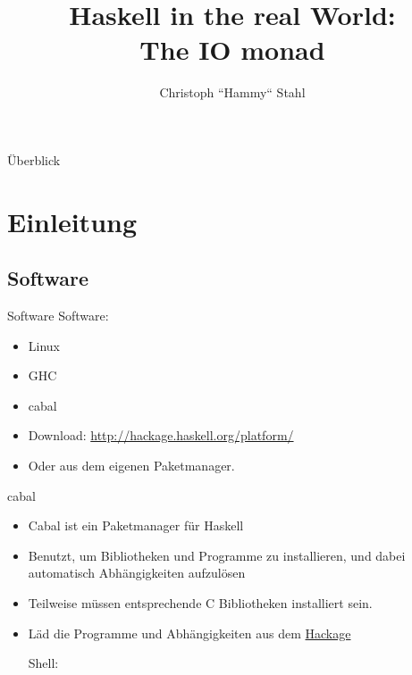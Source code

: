 \documentclass{beamer}
\title{Haskell in the real World: \\ The IO monad}
\author{Christoph ``Hammy`` Stahl}
\begin{document}
\begin{frame}
	\maketitle
\end{frame}
\begin{frame}{Überblick}
\begin{multicols}{2}
\begin{tiny}
\tableofcontents
\end{tiny}
\end{multicols}
\end{frame}

\section{Einleitung}
\subsection{Software}
\begin{frame}[<+->]{Software}
Software:
\begin{itemize}
\item Linux
\item GHC
\item cabal
\item Download: \url{http://hackage.haskell.org/platform/}\\
\item Oder aus dem eigenen Paketmanager.
\end{itemize}
\end{frame}

\begin{frame}[<+->][fragile]{cabal}
\begin{itemize}
\item Cabal ist ein Paketmanager f\"ur Haskell
\item Benutzt, um Bibliotheken und Programme zu installieren, und dabei automatisch Abh\"angigkeiten aufzul\"osen
\item Teilweise m\"ussen entsprechende C Bibliotheken installiert sein.
\item L\"ad die Programme und Abh\"angigkeiten aus dem \textcolor{blue}{\href{http://hackage.haskell.org}{Hackage}}
\begin{block}{Shell:}
\end{block}
\end{itemize}
\end{frame}
\end{document}
